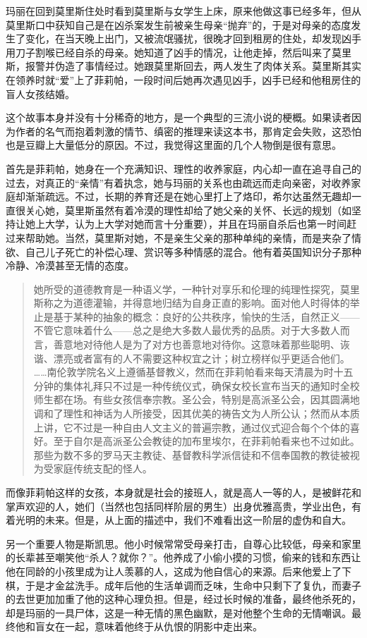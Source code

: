 玛丽在回到莫里斯住处时看到莫里斯与女学生上床，原来他做这事已经多年，但从莫里斯口中获知自己是在凶杀案发生前被亲生母亲“抛弃”的，于是对母亲的态度发生了变化，在当天晚上出门，又被流氓骚扰，很晚才回到租房的住处，却发现凶手用刀子割喉已经自杀的母亲。她知道了凶手的情况，让他走掉，然后叫来了莫里斯，报警并伪造了事情经过。她跟莫里斯回去，两人发生了肉体关系。莫里斯其实在领养时就“爱”上了菲莉帕，一段时间后她再次遇见凶手，凶手已经和他租房住的盲人女孩结婚。

这个故事本身并没有十分稀奇的地方，是一个典型的三流小说的梗概。如果读者因为作者的名气而抱着刺激的情节、缜密的推理来读这本书，那肯定会失败，这恐怕也是豆瓣上大量低分的原因。不过，我觉得这里面的几个人物倒是很有意思。

首先是菲莉帕，她身在一个充满知识、理性的收养家庭，内心却一直在追寻自己的过去，对真正的“亲情”有着执念，她与玛丽的关系也由疏远而走向亲密，对收养家庭却渐渐疏远。不过，长期的养育还是在她心里打上了烙印，希尔达虽然无趣却一直很关心她，莫里斯虽然有着冷漠的理性却给了她父亲的关怀、长远的规划（如坚持让她上大学，认为上大学对她而言十分重要），并且在玛丽自杀后也第一时间赶过来帮助她。当然，莫里斯对她，不是亲生父亲的那种单纯的亲情，而是夹杂了情欲、自己儿子死亡的补偿心理、赏识等多种情感的混合。他有着英国知识分子那种冷静、冷漠甚至无情的态度。
\begin{quotation}
她所受的道德教育是一种语义学，一种针对享乐和伦理的纯理性探究，莫里斯称之为道德灌输，并得意地归结为自身正直的影响。面对他人时得体的举止是基于某种的抽象的概念：良好的公共秩序，愉快的生活，自然正义——不管它意味着什么——总之是绝大多数人最优秀的品质。对于大多数人而言，善意地对待他人是为了对方也善意地对待你。这意味着那些聪明、诙谐、漂亮或者富有的人不需要这种权宜之计；树立榜样似乎更适合他们。
……南伦敦学院名义上遵循基督教义，然而在菲莉帕看来每天清晨为时十五分钟的集体礼拜只不过是一种传统仪式，确保女校长宣布当天的通知时全校师生都在场。有些女孩信奉宗教。圣公会，特别是高派圣公会，因其圆满地调和了理性和神话为人所接受，因其优美的祷告文为人所公认；然而从本质上讲，它不过是一种自由人文主义的普遍宗教，通过仪式迎合每个个体的喜好。至于自尔是高派圣公会教徒的加布里埃尔，在菲莉帕看来也不过如此。那些为数不多的罗马天主教徒、基督教科学派信徒和不信奉国教的教徒被视为受家庭传统支配的怪人。
\end{quotation}
而像菲莉帕这样的女孩，本身就是社会的接班人，就是高人一等的人，是被鲜花和掌声欢迎的人，她们（当然也包括同样阶层的男生）出身优雅高贵，学业出色，有着光明的未来。但是，从上面的描述中，我们不难看出这一阶层的虚伪和自大。

另一个重要人物是斯凯思。他小时候常常受母亲打击，自尊心比较低，母亲和家里的长辈甚至嘲笑他“杀人？就你？”。他养成了小偷小摸的习惯，偷来的钱和东西让他在同龄的小孩里成为让人羡慕的人，这成为他自信心的来源。后来他爱上了下棋，于是才金盆洗手。成年后他的生活单调而乏味，生命中只剩下了复仇，而妻子的去世更加加重了他的这种心理负担。但是，经过长时候的准备，最终他杀死的，却是玛丽的一具尸体，这是一种无情的黑色幽默，是对他整个生命的无情嘲讽。最终他和盲女在一起，意味着他终于从仇恨的阴影中走出来。

